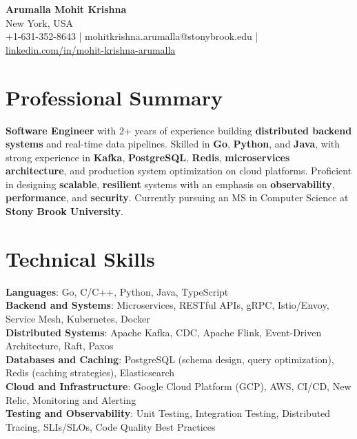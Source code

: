 \documentclass[letterpaper,11pt]{article}
\begin{document}
\begin{center}
  {\Large \textbf{Arumalla Mohit Krishna}} \\
  New York, USA \\
  +1-631-352-8643 \enspace | \enspace mohitkrishna.arumalla@stonybrook.edu \enspace | \enspace \href{https://www.linkedin.com/in/mohit-krishna-arumalla}{linkedin.com/in/mohit-krishna-arumalla}
\end{center}

\section{Professional Summary}
  \begin{itemize}[leftmargin=0.15in, label={}]
    \small{\item{
     \textbf{Software Engineer} with 2+ years of experience building \textbf{distributed backend systems} and real-time data pipelines. Skilled in \textbf{Go}, \textbf{Python}, and \textbf{Java}, with strong experience in \textbf{Kafka}, \textbf{PostgreSQL}, \textbf{Redis}, \textbf{microservices architecture}, and production system optimization on cloud platforms. Proficient in designing \textbf{scalable}, \textbf{resilient} systems with an emphasis on \textbf{observability}, \textbf{performance}, and \textbf{security}. Currently pursuing an MS in Computer Science at \textbf{Stony Brook University}.
    }}
  \end{itemize}
\vspace{-16pt}

\section{Technical Skills}
 \begin{itemize}[leftmargin=0.15in, label={}]
    \small{\item{
     \textbf{Languages}: Go, C/C++, Python, Java, TypeScript \\
     \textbf{Backend and Systems}: Microservices, RESTful APIs, gRPC, Istio/Envoy, Service Mesh, Kubernetes, Docker \\
     \textbf{Distributed Systems}: Apache Kafka, CDC, Apache Flink, Event-Driven Architecture, Raft, Paxos \\
     \textbf{Databases and Caching}: PostgreSQL (schema design, query optimization), Redis (caching strategies), Elasticsearch \\
     \textbf{Cloud and Infrastructure}: Google Cloud Platform (GCP), AWS, CI/CD, New Relic, Monitoring and Alerting \\
     \textbf{Testing and Observability}: Unit Testing, Integration Testing, Distributed Tracing, SLIs/SLOs, Code Quality Best Practices
    }}
 \end{itemize}
\vspace{-16pt}
\end{document}
